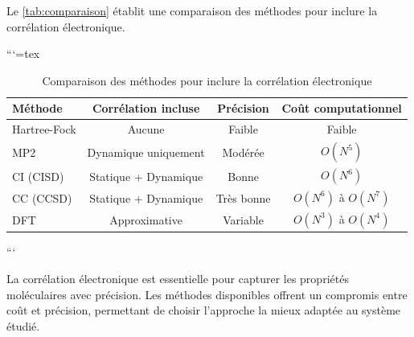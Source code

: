 \documentclass[12pt,a4paper]{report}
\begin{document}
\begin{markdown}
Le \autoref{tab:comparaison} établit une comparaison des méthodes pour inclure la corrélation électronique.

```{=tex}
\begin{table}[h!]
\centering
\caption{Comparaison des méthodes pour inclure la corrélation électronique}
\begin{tabular}{@{}lccc@{}}
\toprule
\textbf{Méthode}       & \textbf{Corrélation incluse} & \textbf{Précision}  & \textbf{Coût computationnel} \\ \midrule
Hartree-Fock           & Aucune                      & Faible              & Faible                       \\
MP2                    & Dynamique uniquement        & Modérée             & $O(N^5)$                     \\
CI (CISD)              & Statique + Dynamique        & Bonne               & $O(N^6)$                     \\
CC (CCSD)              & Statique + Dynamique        & Très bonne          & $O(N^6)$ à $O(N^7)$          \\
DFT                    & Approximative               & Variable            & $O(N^3)$ à $O(N^4)$          \\ \bottomrule
\end{tabular}
\label{tab:comparaison}
\end{table}
```

La corrélation électronique est essentielle pour capturer les propriétés moléculaires avec précision. Les méthodes disponibles offrent un compromis entre coût et précision, permettant de choisir l’approche la mieux adaptée au système étudié.


\end{markdown}
\end{document}
